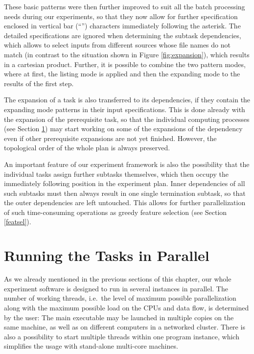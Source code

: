 \documentclass[12pt,notitlepage]{report}
\begin{document}
These basic patterns were then further improved to suit all the batch processing needs during our experiments, so that they now allow for further specification enclosed in vertical bar (``\textbar'') characters immediately following the asterisk. The detailed specifications are ignored when determining the subtask dependencies, which allows to select inputs from different sources whose file names do not match (in contrast to the situation shown in Figure \ref{fig:expansion}), which results in a cartesian product. Further, it is possible to combine the two pattern modes, where at first, the listing mode is applied and then the expanding mode to the results of the first step.

The expansion of a task is also transferred to its dependencies, if they contain the expanding mode patterns in their input specifications. This is done already with the expansion of the prerequisite task, so that the individual computing processes (see Section \ref{parallel}) may start working on some of the expansions of the dependency even if other prerequisite expansions are not yet finished. However, the topological order of the whole plan is always preserved. 
 
An important feature of our experiment framework is also the possibility that the individual tasks assign further subtasks themselves, which then occupy the immediately following position in the experiment plan. Inner dependencies of all such subtasks must then always result in one single termination subtask, so that the outer dependencies are left untouched. This allows for further parallelization of such time-consuming operations as greedy feature selection (see Section \ref{featsel}).

\section{Running the Tasks in Parallel}\label{parallel}

As we already mentioned in the previous sections of this chapter, our whole experiment software is designed to run in several instances in parallel. The number of working threads, i.e.\ the level of maximum possible parallelization along with the maximum possible load on the CPUs and data flow, is determined by the user: The main executable may be launched in multiple copies on the same machine, as well as on different computers in a networked cluster. There is also a possibility to start multiple threads within one program instance, which simplifies the usage with stand-alone multi-core machines.
\end{document}
